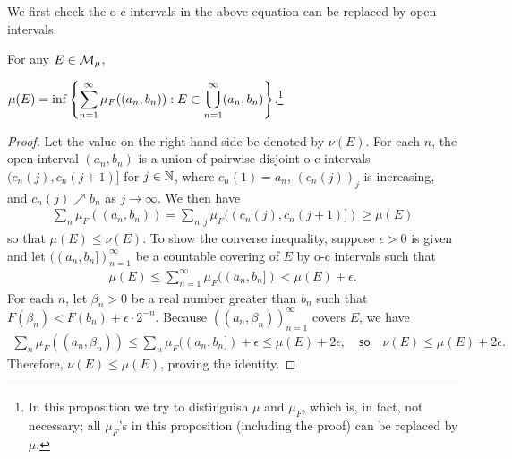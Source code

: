 We first check the o-c intervals in the above equation can be replaced by open intervals.
\begin{prop}
    For any $E\in{\mathcal{M}}_\mu$,
    \begin{center}
        $\displaystyle{\mu(E)=\inf\left\{
            \sum_{n=1}^\infty\mu_F((a_n, b_n))
            :
            E\subset\bigcup_{n=1}^\infty(a_n, b_n)
        \right\}}$.\footnote{In this proposition we try to distinguish $\mu$ and $\mu_F$, which is, in fact, not necessary; all $\mu_F$'s in this proposition (including the proof) can be replaced by $\mu$.}
    \end{center}
\end{prop}
\begin{proof}
    Let the value on the right hand side be denoted by $\nu(E)$.
    For each $n$, the open interval $(a_n, b_n)$ is a union of pairwise disjoint o-c intervals $(c_n(j), c_n(j+1)]$ for $j\in{\mathbb{N}}$, where $c_n(1)=a_n$, $(c_n(j))_j$ is increasing, and $c_n(j)\nearrow b_n$ as $j\rightarrow\infty$.
    We then have
    \begin{align*}
        \sum_n\mu_F((a_n, b_n))=\sum_{n, j}\mu_F((c_n(j), c_n(j+1)])\geq\mu(E)
    \end{align*}
    so that $\mu(E)\leq\nu(E)$.
    To show the converse inequality, suppose $\epsilon>0$ is given and let $((a_n, b_n])_{n=1}^\infty$ be a countable covering of $E$ by o-c intervals such that
    \begin{align*}
        \mu(E)\leq\sum_{n=1}^\infty\mu_F((a_n, b_n])<\mu(E)+\epsilon.
    \end{align*}
    For each $n$, let $\beta_n>0$ be a real number greater than $b_n$ such that $F(\beta_n)<F(b_n)+\epsilon\cdot 2^{-n}$.
    Because $((a_n, \beta_n))_{n=1}^\infty$ covers $E$, we have
    \begin{align*}
        \sum_n\mu_F((a_n, \beta_n))\leq\sum_n\mu_F((a_n, b_n])+\epsilon\leq\mu(E)+2\epsilon,
        \quad\textsf{so}\quad
        \nu(E)\leq\mu(E)+2\epsilon.
    \end{align*}
    Therefore, $\nu(E)\leq\mu(E)$, proving the identity.    
\end{proof}

